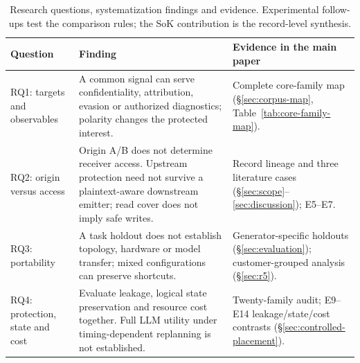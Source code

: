 \begin{table}[t]\centering\footnotesize
\caption{Research questions, systematization findings and evidence. Experimental follow-ups test the comparison rules; the SoK contribution is the record-level synthesis.}\label{tab:rq-findings}
\begin{tabularx}{\textwidth}{@{}p{}YY@{}}\toprule
Question & Finding & Evidence in the main paper\\\midrule
RQ1: targets and observables & A common signal can serve confidentiality, attribution, evasion or authorized diagnostics; polarity changes the protected interest. & Complete core-family map (\S\ref{sec:corpus-map}, Table~\ref{tab:core-family-map}).\\
RQ2: origin versus access & Origin A/B does not determine receiver access. Upstream protection need not survive a plaintext-aware downstream emitter; read cover does not imply safe writes. & Record lineage and three literature cases (\S\ref{sec:scope}--\ref{sec:discussion}); E5--E7.\\
RQ3: portability & A task holdout does not establish topology, hardware or model transfer; mixed configurations can preserve shortcuts. & Generator-specific holdouts (\S\ref{sec:evaluation}); customer-grouped analysis (\S\ref{sec:r5}).\\
RQ4: protection, state and cost & Evaluate leakage, logical state preservation and resource cost together. Full LLM utility under timing-dependent replanning is not established. & Twenty-family audit; E9--E14 leakage/state/cost contrasts (\S\ref{sec:controlled-placement}).\\\bottomrule
\end{tabularx}\end{table}
